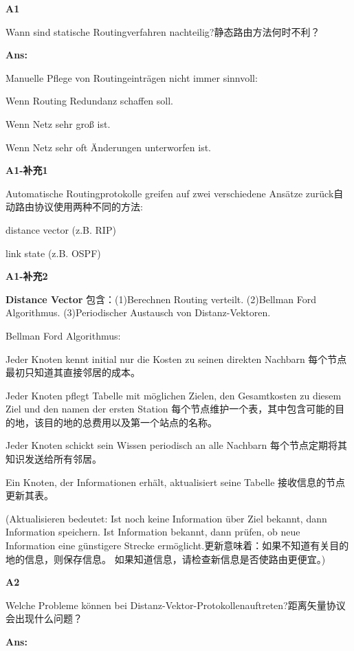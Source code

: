 \documentclass[fleqn]{article}
\begin{document}
\noindent\textbf{A1}

Wann sind statische Routingverfahren nachteilig?静态路由方法何时不利？

\textbf{Ans:}

Manuelle Pflege von Routingeinträgen nicht immer sinnvoll:

\indent \indent Wenn Routing Redundanz schaffen soll.

\indent \indent Wenn Netz sehr groß ist.

\indent \indent Wenn Netz sehr oft Änderungen unterworfen ist.

\noindent\textbf{A1-补充1}

Automatische Routingprotokolle greifen auf zwei verschiedene Ansätze zurück自动路由协议使用两种不同的方法:

\indent \indent distance vector (z.B. RIP)

\indent \indent link state (z.B. OSPF)

\noindent\textbf{A1-补充2}

\textbf{Distance Vector} 包含：(1)Berechnen Routing verteilt. (2)Bellman Ford Algorithmus. (3)Periodischer Austausch von Distanz-Vektoren.

Bellman Ford Algorithmus:

\indent \indent Jeder Knoten kennt initial nur die Kosten zu seinen direkten Nachbarn
每个节点最初只知道其直接邻居的成本。

\indent \indent Jeder Knoten pflegt Tabelle mit möglichen Zielen, den Gesamtkosten zu diesem Ziel und den namen der ersten Station
每个节点维护一个表，其中包含可能的目的地，该目的地的总费用以及第一个站点的名称。

\indent \indent Jeder Knoten schickt sein Wissen periodisch an alle Nachbarn
每个节点定期将其知识发送给所有邻居。

\indent \indent Ein Knoten, der Informationen erhält, aktualisiert seine Tabelle
接收信息的节点更新其表。

\indent \indent (Aktualisieren bedeutet: Ist noch keine Information über Ziel bekannt, dann Information speichern. Ist Information bekannt, dann prüfen, ob neue Information eine günstigere Strecke ermöglicht.更新意味着：如果不知道有关目的地的信息，则保存信息。 如果知道信息，请检查新信息是否使路由更便宜。)

\noindent\textbf{A2}

Welche Probleme können  bei Distanz-Vektor-Protokollenauftreten?距离矢量协议会出现什么问题？

\textbf{Ans:}
\end{document}
